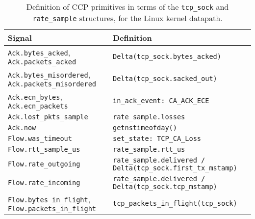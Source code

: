 \begin{table}
    \centering
    \footnotesize
    \begin{tabular}{p{}p{}}
        \textbf{Signal} & \textbf{Definition} \\
        \hline
        \texttt{Ack.bytes\_acked}, \texttt{Ack.packets\_acked}             & \texttt{Delta(tcp\_sock.bytes\_acked)} \\
        \texttt{Ack.bytes\_misordered}, \texttt{Ack.packets\_misordered}   & \texttt{Delta(tcp\_sock.sacked\_out)} \\
        \texttt{Ack.ecn\_bytes}, \texttt{Ack.ecn\_packets}                 & \texttt{in\_ack\_event: CA\_ACK\_ECE} \\
        \texttt{Ack.lost\_pkts\_sample}                                    & \texttt{rate\_sample.losses} \\
        \texttt{Ack.now}                                                   & \texttt{getnstimeofday()}\\
        \texttt{Flow.was\_timeout}                                         & \texttt{set\_state: TCP\_CA\_Loss} \\
        \texttt{Flow.rtt\_sample\_us}                                      & \texttt{rate\_sample.rtt\_us} \\
        \texttt{Flow.rate\_outgoing}                                       & \texttt{rate\_sample.delivered / Delta(tcp\_sock.first\_tx\_mstamp)} \\
        \texttt{Flow.rate\_incoming}                                       & \texttt{rate\_sample.delivered / Delta(tcp\_sock.tcp\_mstamp)}  \\
        \texttt{Flow.bytes\_in\_flight}, \texttt{Flow.packets\_in\_flight} & \texttt{tcp\_packets\_in\_flight(tcp\_sock)} \\
    \end{tabular}
    \caption{Definition of CCP primitives in terms of the \texttt{tcp\_sock} and \texttt{rate\_sample} structures, for the Linux kernel datapath.}\label{tab:api:kernel}
\end{table}
